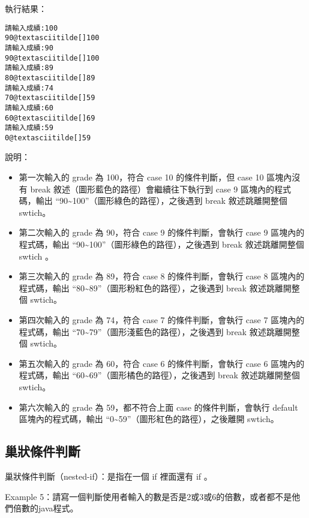 \documentclass[a4paper,12pt,english]{sphinxmanual}
\begin{document}
執行結果：

\begin{Verbatim}[commandchars=@\[\]]
請輸入成績:100
90@textasciitilde[]100
請輸入成績:90
90@textasciitilde[]100
請輸入成績:89
80@textasciitilde[]89
請輸入成績:74
70@textasciitilde[]59
請輸入成績:60
60@textasciitilde[]69
請輸入成績:59
0@textasciitilde[]59
\end{Verbatim}

說明：
\begin{itemize}
\item {} 
第一次輸入的 grade 為 100，符合 case 10 的條件判斷，但 case 10 區塊內沒有 break 敘述（圖形藍色的路徑）會繼續往下執行到 case 9 區塊內的程式碼，輸出 ``90\textasciitilde{}100''（圖形綠色的路徑），之後遇到 break 敘述跳離開整個 swtich。

\item {} 
第二次輸入的 grade 為 90，符合 case 9 的條件判斷，會執行 case 9 區塊內的程式碼，輸出 ``90\textasciitilde{}100''（圖形綠色的路徑），之後遇到 break 敘述跳離開整個 swtich 。

\item {} 
第三次輸入的 grade 為 89，符合 case 8 的條件判斷，會執行 case 8 區塊內的程式碼，輸出 ``80\textasciitilde{}89''（圖形粉紅色的路徑），之後遇到 break 敘述跳離開整個 swtich。

\item {} 
第四次輸入的 grade 為 74，符合 case 7 的條件判斷，會執行 case 7 區塊內的程式碼，輸出 ``70\textasciitilde{}79''（圖形淺藍色的路徑），之後遇到 break 敘述跳離開整個 swtich。

\item {} 
第五次輸入的 grade 為 60，符合 case 6 的條件判斷，會執行 case 6 區塊內的程式碼，輸出 ``60\textasciitilde{}69''（圖形橘色的路徑），之後遇到 break 敘述跳離開整個 swtich。

\item {} 
第六次輸入的 grade 為 59，都不符合上面 case 的條件判斷，會執行 default 區塊內的程式碼，輸出 ``0\textasciitilde{}59''（圖形紅色的路徑），之後離開 swtich。

\end{itemize}


\subsection{巢狀條件判斷}
\label{java_cond:id6}
巢狀條件判斷（nested-if）：是指在一個 if 裡面還有 if 。

Example 5：請寫一個判斷使用者輸入的數是否是2或3或6的倍數，或者都不是他們倍數的java程式。
\end{document}
